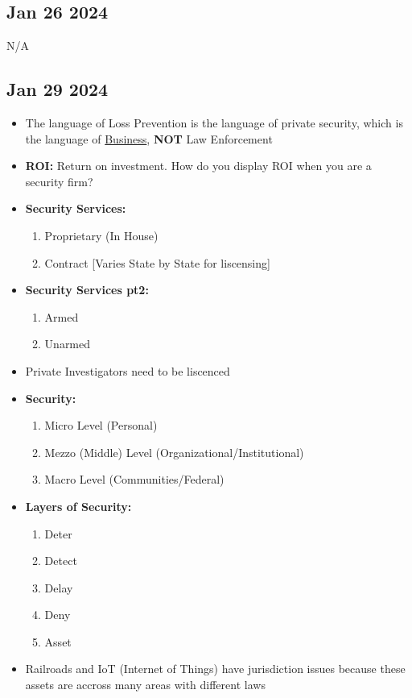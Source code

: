 \documentclass[12pt]{article}
\begin{document}
\subsection{Jan 26 2024}

N/A

\subsection{Jan 29 2024}

\begin{itemize}
		  \item The language of Loss Prevention is the language of private security, which is the language of 
					 \underline{Business}, \textbf{NOT} Law Enforcement
		  \item \textbf{ROI:} Return on investment. How do you display ROI when you are a security firm?
		  \item \textbf{Security Services:}
					 \begin{enumerate}
								\item Proprietary (In House) 
								\item Contract [Varies State by State for liscensing]
					 \end{enumerate}
		  \item \textbf{Security Services pt2:}
					 \begin{enumerate}
								\item Armed 
								\item Unarmed
					 \end{enumerate}
		  \item Private Investigators need to be liscenced
		  \item \textbf{Security:} 
					 \begin{enumerate}
								\item Micro Level (Personal)
								\item Mezzo (Middle) Level (Organizational/Institutional)
								\item Macro Level (Communities/Federal)
					 \end{enumerate}
		  \item \textbf{Layers of Security:} 
					 \begin{enumerate}
								\item Deter
								\item Detect
								\item Delay
								\item Deny
								\item Asset
					 \end{enumerate}
		  \item Railroads and IoT (Internet of Things) have jurisdiction issues because these 
					 assets are accross many areas with different laws
\end{itemize}
\end{document}
